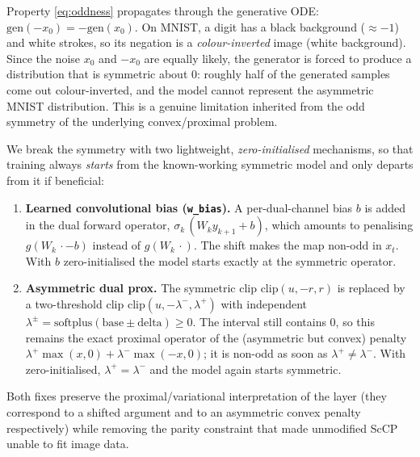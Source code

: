 Property \eqref{eq:oddness} propagates through the generative ODE:
$\mathrm{gen}(-x_0) = -\mathrm{gen}(x_0)$. On MNIST, a digit has a black
background ($\approx -1$) and white strokes, so its negation is a
\emph{colour-inverted} image (white background). Since the noise $x_0$ and $-x_0$
are equally likely, the generator is forced to produce a distribution that is
symmetric about $0$: roughly half of the generated samples come out
colour-inverted, and the model cannot represent the asymmetric MNIST
distribution. This is a genuine limitation inherited from the odd symmetry of the
underlying convex/proximal problem.

We break the symmetry with two lightweight, \emph{zero-initialised} mechanisms,
so that training always \emph{starts} from the known-working symmetric model and
only departs from it if beneficial:
\begin{enumerate}
    \item \textbf{Learned convolutional bias (\texttt{w\_bias}).} A per-dual-channel
          bias $b$ is added in the dual forward operator,
          $\sigma_k\,(W_k y_{k+1} + b)$, which amounts to penalising
          $g(W_k\,\cdot - b)$ instead of $g(W_k\,\cdot)$. The shift makes the map
          non-odd in $x_t$. With $b$ zero-initialised the model starts exactly at
          the symmetric operator.
    \item \textbf{Asymmetric dual prox.} The symmetric clip
          $\mathrm{clip}(u,-r,r)$ is replaced by a two-threshold clip
          $\mathrm{clip}(u,-\lambda^-,\lambda^+)$ with independent
          $\lambda^\pm = \mathrm{softplus}(\text{base} \pm \text{delta}) \ge 0$.
          The interval still contains $0$, so this remains the exact proximal
          operator of the (asymmetric but convex) penalty
          $\lambda^+ \max(x,0) + \lambda^- \max(-x,0)$; it is non-odd as soon as
          $\lambda^+ \neq \lambda^-$. With  zero-initialised,
          $\lambda^+ = \lambda^-$ and the model again starts symmetric.
\end{enumerate}
Both fixes preserve the proximal/variational interpretation of the layer (they
correspond to a shifted argument and to an asymmetric convex penalty
respectively) while removing the parity constraint that made unmodified ScCP
unable to fit image data.



